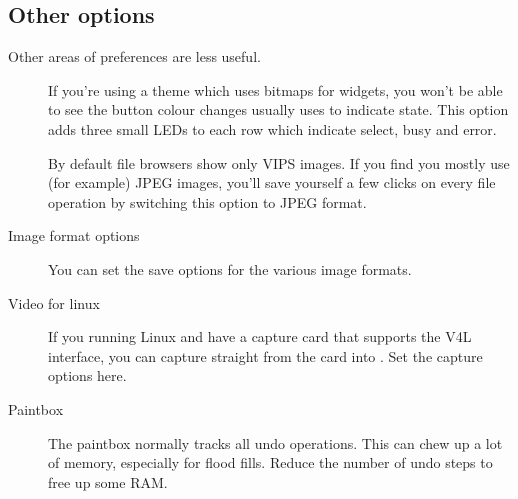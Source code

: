 \subsection{Other options}

Other areas of preferences are less useful. 

\begin{description}

\item[]

If you're using a theme which uses bitmaps for widgets, you won't be able to
see the button colour changes \nip{} usually uses to indicate state. This
option adds three small LEDs to each row which indicate select, busy and
error.

\item[]

By default \nip{} file browsers show only VIPS images. If you find you mostly
use (for example) JPEG images, you'll save yourself a few clicks on every file
operation by switching this option to JPEG format.

\item[Image format options]

You can set the save options for the various image formats. 

\item[Video for linux]

If you running Linux and have a capture card that supports the V4L interface,
you can capture straight from the card into \nip{}. Set the capture options
here.

\item[Paintbox]

The paintbox normally tracks all undo operations. This can chew up a lot of
memory, especially for flood fills. Reduce the number of undo steps to free 
up some RAM.

\end{description}

